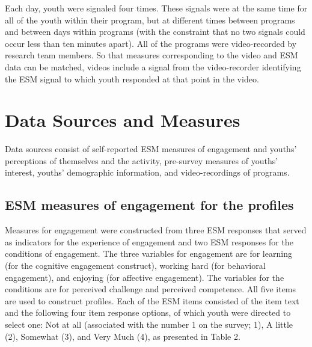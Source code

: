 \documentclass[]{book}
\theoremstyle{definition}
\theoremstyle{definition}
\theoremstyle{definition}
\theoremstyle{remark}
\begin{document}
Each day, youth were signaled four times. These signals were at the same
time for all of the youth within their program, but at different times
between programs and between days within programs (with the constraint
that no two signals could occur less than ten minutes apart). All of the
programs were video-recorded by research team members. So that measures
corresponding to the video and ESM data can be matched, videos include a
signal from the video-recorder identifying the ESM signal to which youth
responded at that point in the video.

\section{Data Sources and Measures}\label{data-sources-and-measures}

Data sources consist of self-reported ESM measures of engagement and
youths' perceptions of themselves and the activity, pre-survey measures
of youths' interest, youths' demographic information, and
video-recordings of programs.

\subsection{ESM measures of engagement for the
profiles}\label{esm-measures-of-engagement-for-the-profiles}

Measures for engagement were constructed from three ESM responses that
served as indicators for the experience of engagement and two ESM
responses for the conditions of engagement. The three variables for
engagement are for learning (for the cognitive engagement construct),
working hard (for behavioral engagement), and enjoying (for affective
engagement). The variables for the conditions are for perceived
challenge and perceived competence. All five items are used to construct
profiles. Each of the ESM items consisted of the item text and the
following four item response options, of which youth were directed to
select one: Not at all (associated with the number 1 on the survey; 1),
A little (2), Somewhat (3), and Very Much (4), as presented in Table 2.

\begin{table}

\caption{\label{tab:unnamed-chunk-4}ESM measures for profiles}
\centering
{}
\end{table}
\end{document}

